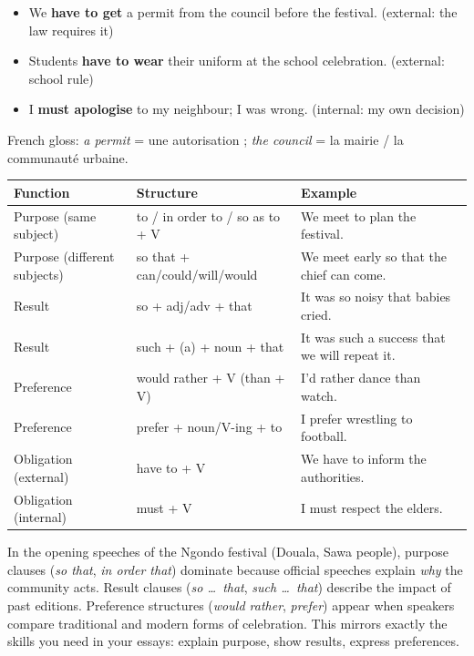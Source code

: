 \documentclass[11pt]{article}
\newcommand{\cle}[1]{{\popxbold\color{popdark}#1}}
\begin{document}
\begin{exemplebox}
\begin{itemize}
\item We \textbf{have to get} a permit from the council before the festival. (external: the law requires it)
\item Students \textbf{have to wear} their uniform at the school celebration. (external: school rule)
\item I \textbf{must apologise} to my neighbour; I was wrong. (internal: my own decision)
\end{itemize}
French gloss: \emph{a permit} = une autorisation ; \emph{the council} = la mairie / la communauté urbaine.
\end{exemplebox}

\begin{aretenir}
\begin{center}
\begin{tabularx}{\linewidth}{|l|X|X|}
\hline
\rowcolor{popblueL} \textbf{Function} & \textbf{Structure} & \textbf{Example} \\
\hline
Purpose (same subject) & to / in order to / so as to + V & We meet to plan the festival. \\
\hline
Purpose (different subjects) & so that + can/could/will/would & We meet early so that the chief can come. \\
\hline
Result & so + adj/adv + that & It was so noisy that babies cried. \\
\hline
Result & such + (a) + noun + that & It was such a success that we will repeat it. \\
\hline
Preference & would rather + V (than + V) & I'd rather dance than watch. \\
\hline
Preference & prefer + noun/V-ing + to & I prefer wrestling to football. \\
\hline
Obligation (external) & have to + V & We have to inform the authorities. \\
\hline
Obligation (internal) & must + V & I must respect the elders. \\
\hline
\end{tabularx}
\end{center}
\end{aretenir}

\begin{exemplebox}
In the opening speeches of the \cle{Ngondo} festival (Douala, Sawa people), purpose clauses (\emph{so that}, \emph{in order that}) dominate because official speeches explain \emph{why} the community acts. Result clauses (\emph{so \ldots\ that}, \emph{such \ldots\ that}) describe the impact of past editions. Preference structures (\emph{would rather}, \emph{prefer}) appear when speakers compare traditional and modern forms of celebration. This mirrors exactly the skills you need in your essays: explain purpose, show results, express preferences.
\end{exemplebox}
\end{document}
